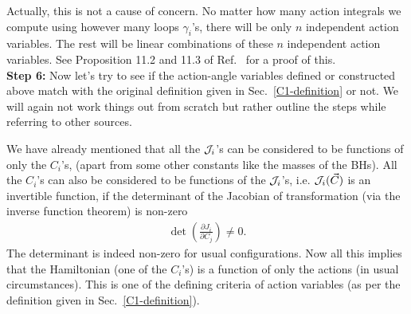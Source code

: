 Actually, this is not a cause of concern. No matter how many action
integrals we compute using however many loops $\gamma_i$'s, there
will be only $n$ independent action variables. The rest will be linear 
combinations of these $n$ independent action variables. 
See Proposition 11.2 and 11.3 of Ref.~\cite{fasano} for a proof of this.\\



\textbf{Step 6:}
Now let's try to see if the action-angle variables defined or constructed
above match with the original definition given in Sec.~\ref{C1-definition}
or not. We will again not work things out from scratch but rather
outline the steps while referring to other sources.


We have already mentioned that
all the $\mathcal{J}_i$'s can be considered to be functions of only the $C_i$'s,
(apart from some other constants like the masses of the BHs).
All the $C_i$'s can also be considered to be functions of the
$\mathcal{J}_i$'s, i.e. $\mathcal{J}_i(\vec{C})$ is an invertible function,
if the determinant of the Jacobian of transformation 
(via the inverse function theorem)
is non-zero
\begin{align}
\operatorname{det}\left(\frac{\partial J_{i}}{\partial C_{j}}\right) \neq 0 .  \label{invert_condition}
\end{align}
The determinant is indeed non-zero for usual 
configurations. Now all this 
implies that the Hamiltonian (one of the $C_i$'s) is a function of
only the actions (in usual circumstances). This is
one of the defining criteria of action variables
(as per the definition given in Sec.~\ref{C1-definition}).





\hfill \break


